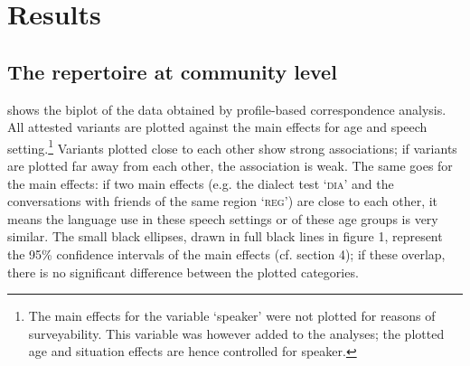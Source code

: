 \documentclass[output=paper]{LSP/langsci}
\begin{document}
\section{Results}

\subsection{The repertoire at community level}

 shows the biplot of the data obtained by profile-based correspondence analysis. All attested variants are plotted against the main effects for age and speech setting.\footnote{The main effects for the variable ‘speaker’ were not plotted for reasons of surveyability. This variable was however added to the analyses; the plotted age and situation effects are hence controlled for speaker.} Variants plotted close to each other show strong associations; if variants are plotted far away from each other, the association is weak. The same goes for the main effects: if two main effects (e.g. the dialect test ‘\textsc{dia’} and the conversations with friends of the same region ‘\textsc{reg’}) are close to each other, it means the language use in these speech settings or of these age groups is very similar. The small black ellipses, drawn in full black lines in figure 1, represent the 95\% confidence intervals of the main effects (cf. section 4); if these overlap, there is no significant difference between the plotted categories. 
\end{document}
